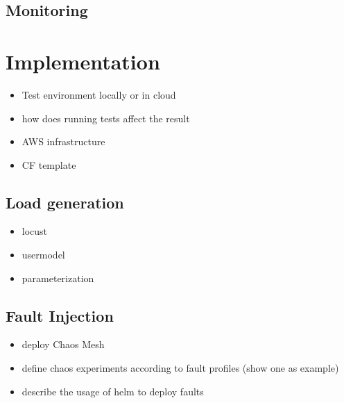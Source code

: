 \subsection{Monitoring}


\section{Implementation}

\begin{itemize}
	\item Test environment locally or in cloud
	\item how does running tests affect the result
	\item AWS infrastructure
	\item CF template
\end{itemize}

\subsection{Load generation}

\begin{itemize}
	\item locust
	\item usermodel
	\item parameterization
\end{itemize}

\subsection{Fault Injection}

\begin{itemize}
	\item deploy Chaos Mesh
	\item define chaos experiments according to fault profiles (show one as example)
	\item describe the usage of helm to deploy faults
\end{itemize}

